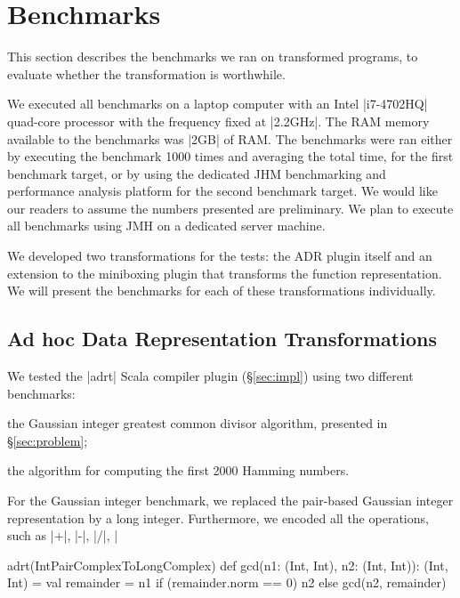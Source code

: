 \section{Benchmarks}
\label{sec:benchmarks}

This section describes the benchmarks we ran on transformed programs, to evaluate whether the transformation is worthwhile.

We executed all benchmarks on a laptop computer with an Intel |i7-4702HQ| quad-core processor with the frequency fixed at |2.2GHz|. The RAM memory available to the benchmarks was |2GB| of RAM. The benchmarks were ran either by executing the benchmark 1000 times and averaging the total time, for the first benchmark target, or by using the dedicated JHM benchmarking and performance analysis platform \cite{aleksey_shipilev_openjdk:_????} for the second benchmark target. We would like our readers to assume the numbers presented are preliminary. We plan to execute all benchmarks using JMH on a dedicated server machine.

We developed two transformations for the tests: the ADR plugin itself and an extension to the miniboxing plugin \cite{miniboxing} that transforms the function representation. We will present the benchmarks for each of these transformations individually.

\subsection{Ad hoc Data Representation Transformations}
\label{sec:benchmarks:ad-hoc}

We tested the |adrt| Scala compiler plugin (\S\ref{sec:impl}) using two different benchmarks:

\begin{compactitem}
\item the Gaussian integer greatest common divisor algorithm, presented in \S\ref{sec:problem};
\item the algorithm for computing the first 2000 Hamming numbers.
\end{compactitem}

For the Gaussian integer benchmark, we replaced the pair-based Gaussian integer representation by a long integer. Furthermore, we encoded all the operations, such as |+|, |-|, |/|, |%

\begin{lstlisting-nobreak}
adrt(IntPairComplexToLongComplex) {
  def gcd(n1: (Int, Int), n2: (Int, Int)): (Int, Int) = {
    val remainder = n1 %
    if (remainder.norm == 0) n2 else gcd(n2, remainder)
  }
}
\end{lstlisting-nobreak}

